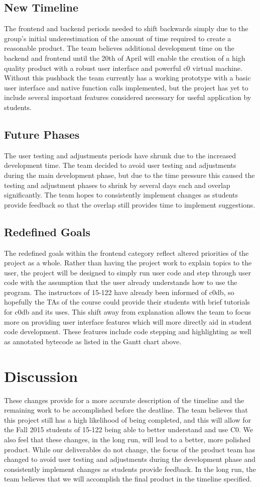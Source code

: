 \documentclass[11pt]{article}
\begin{document}
\subsection{New Timeline}
The frontend and backend periods needed to shift backwards simply due to the
group’s initial underestimation of the amount of time required to create a
reasonable product. The team believes additional development time on the
backend and frontend until the 20th of April will enable the creation of a high
quality product with a robust user interface and powerful c0 virtual machine.
Without this pushback the team currently has a working prototype with a basic
user interface and native function calls implemented, but the project has yet
to include several important features considered necessary for useful
application by students.
\subsection{Future Phases}
The user testing and adjustments periods have shrunk due to the increased
development time. The team decided to avoid user testing and adjustments during
the main development phase, but due to the time pressure this caused the
testing and adjustment phases to shrink by several days each and overlap
significantly. The team hopes to consistently implement changes as students
provide feedback so that the overlap still provides time to implement
suggestions.
\subsection{Redefined Goals}
The redefined goals within the frontend category reflect altered priorities of
the project as a whole. Rather than having the project work to explain topics
to the user, the project will be designed to simply run user code and step
through user code with the assumption that the user already understands how to
use the program. The instructors of 15-122 have already been informed of c0db,
so hopefully the TAs of the course could provide their students with brief
tutorials for c0db and its uses. This shift away from explanation allows the
team to focus more on providing user interface features which will more
directly aid in student code development. These features include code stepping
and highlighting as well as annotated bytecode as listed in the Gantt chart
above.
\section{Discussion}
These changes provide for a more accurate description of the timeline and the
remaining work to be accomplished before the deatline. The team believes that
this project still has a high likelihood of being completed, and this will
allow for the Fall 2015 students of 15-122 being able to better understand
and use C0. We also feel that these changes, in the long run, will lead to a
better, more polished product. While our deliverables do not change, the focus
of the product team has changed to avoid user testing and adjustments during
the development phase and consistently implement changes as students provide
feedback. In the long run, the team believes that we will accomplish the final
product in the timeline specified.
\end{document}
